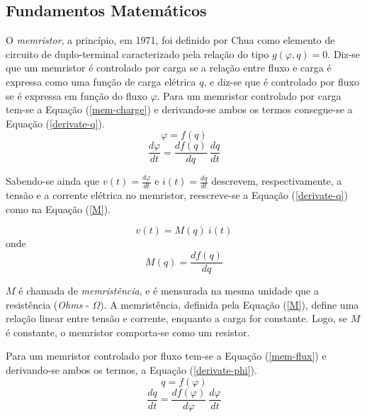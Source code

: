 \documentclass{ceel}
\begin{document}
\begin{multicols}{2}
\section{Fundamentos Matemáticos}\label{analise-matematica}
O \emph{memristor}, a princípio, em 1971, foi definido por Chua \cite{artigo} como elemento de circuito de duplo-terminal caracterizado pela relação do tipo $g(\varphi, q)=0$. Diz-se que 
um memristor é controlado por carga se a relação entre fluxo e carga é expressa como uma função de carga elétrica $q$, e diz-se que é controlado por fluxo se é expressa em função do 
fluxo $\varphi$. Para um memristor controlado por carga tem-se a Equação (\ref{mem-charge}) e derivando-se ambos os termos consegue-se a Equação (\ref{derivate-q}).
\begin{equation}\label{mem-charge}
\varphi = f(q)
\end{equation}
\vspace{-0.2cm}
\begin{equation}\label{derivate-q}
\dfrac{d\varphi}{dt}=\dfrac{df(q)}{dq} \ \dfrac{dq}{dt}
\end{equation}
\vspace{0.05cm}

Sabendo-se ainda que $v(t)=\frac{d\varphi}{dt}$ e $i(t)=\frac{dq}{dt}$ descrevem, respectivamente, a tensão e a corrente elétrica no memristor, 
reescreve-se a Equação (\ref{derivate-q}) como na Equação (\ref{M}).

\begin{equation}\label{vMi}
v(t)=M(q)\ i(t)
\end{equation}
\noindent onde
\begin{equation} \label{M}
M(q) =\dfrac{df(q)}{dq}
\end{equation}

$M$ é chamada de \textit{memristência}, e é mensurada na mesma unidade que a resistência (\textit{Ohms} - $\Omega$). A memristência, definida pela Equação (\ref{M}), define uma relação linear entre tensão e corrente, enquanto a carga for constante. Logo, se $M$ é constante, o memristor comporta-se como um resistor.

Para um memristor controlado por fluxo tem-se a Equação (\ref{mem-flux}) e derivando-se ambos os termos, a Equação (\ref{derivate-phi}).
\begin{equation}\label{mem-flux}
q = f(\varphi)
\end{equation}
\vspace{-0.2cm}
\begin{equation}\label{derivate-phi}
\dfrac{dq}{dt}=\dfrac{df(\varphi)}{d\varphi} \ \dfrac{d\varphi}{dt}
\end{equation}
\vspace{0.04cm}


\end{multicols}
\end{document}
